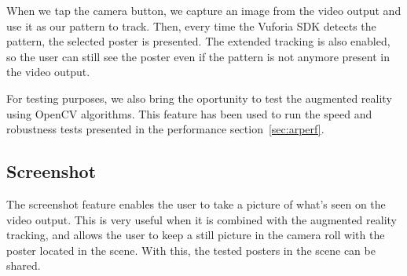 When we tap the camera button, we capture an image from the video output and
use it as our pattern to track. Then, every time the Vuforia SDK detects the
pattern, the selected poster is presented. The extended tracking is also
enabled, so the user can still see the poster even if the pattern is not
anymore present in the video output.

For testing purposes, we also bring the oportunity to test the augmented
reality using OpenCV algorithms. This feature has been used to run the speed
and robustness tests presented in the performance section~\ref{sec:arperf}.

\subsection*{Screenshot}
\label{sub:screenshot}
The screenshot feature enables the user to take a picture of what's seen on the
video output. This is very useful when it is combined with the augmented
reality tracking, and allows the user to keep a still picture in the camera
roll with the poster located in the scene. With this, the tested posters in the
scene can be shared.

